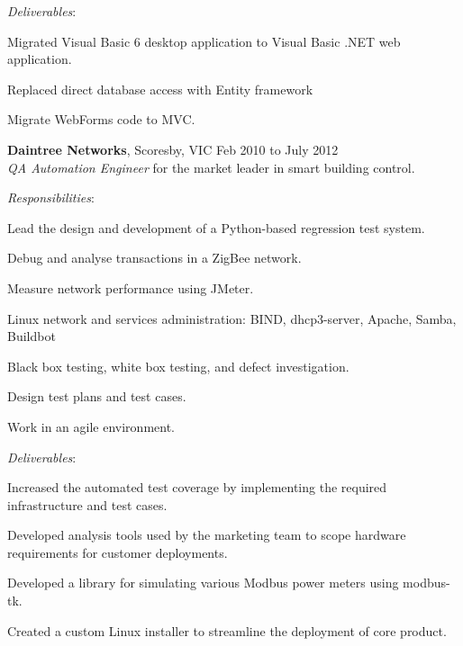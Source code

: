 \documentclass[line,margin]{res}
\begin{document}
\begin{resume}
        \textit{Deliverables}:
        \begin{list}{}{\leftmargin=1em \itemsep=-2pt}
            \item{Migrated Visual Basic 6 desktop application to Visual Basic .NET web application.}
            \item{Replaced direct database access with Entity framework}
            \item{Migrate WebForms code to MVC.}
        \end{list}

        \textbf{Daintree Networks}, Scoresby, VIC \hfill Feb 2010 to July 2012 \\
        \textit{QA Automation Engineer} for the market leader in smart building control.

        \textit{Responsibilities}:
        \begin{list}{}{\leftmargin=1em \itemsep=-2pt}
            \item{Lead the design and development of a Python-based regression test system.}
            \item{Debug and analyse transactions in a ZigBee network.}
            \item{Measure network performance using JMeter.}
            \item{Linux network and services administration: BIND, dhcp3-server, Apache, Samba, Buildbot}
            \item{Black box testing, white box testing, and defect investigation.}
            \item{Design test plans and test cases.}
            \item{Work in an agile environment.}
        \end{list}
             
        \textit{Deliverables}:
        \begin{list}{}{\leftmargin=1em \itemsep=-2pt}
            \item{Increased the automated test coverage by implementing the required infrastructure and
            test cases.}
            \item{Developed analysis tools used by the marketing team to scope hardware
            requirements for customer deployments.}
            \item{Developed a library for simulating various Modbus power meters using modbus-tk.}
            \item{Created a custom Linux installer to streamline the deployment of core product.}
        \end{list}


\end{resume}
\end{document}

